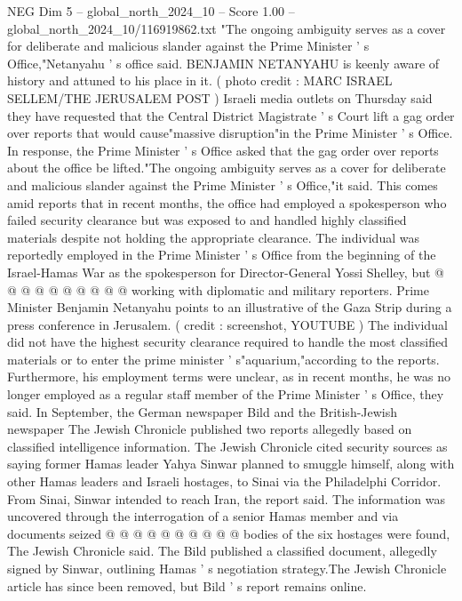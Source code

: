 \begin{textsample}{NEG Dim 5 – global\_north\_2024\_10 – Score 1.00 – global\_north\_2024\_10/116919862.txt}  \label{ex:f5_neg_041}
"The ongoing ambiguity serves as a cover for deliberate and malicious slander against the Prime Minister ' s Office,"Netanyahu ' s office said.
BENJAMIN NETANYAHU is keenly aware of history and attuned to his place in it. ( photo credit : MARC ISRAEL SELLEM/THE JERUSALEM POST ) Israeli media outlets on Thursday said they have requested that the Central District Magistrate ' s Court lift a gag order over reports that would cause"massive disruption"in the Prime Minister ' s Office.
In response, the Prime Minister ' s Office asked that the gag order over reports about the office be lifted."The ongoing ambiguity serves as a cover for deliberate and malicious slander against the Prime Minister ' s Office,"it said.
This comes amid reports that in recent months, the office had employed a spokesperson who failed security clearance but was exposed to and handled highly classified materials despite not holding the appropriate clearance.
The individual was reportedly employed in the Prime Minister ' s Office from the beginning of the Israel-Hamas War as the spokesperson for Director-General Yossi Shelley, but @ @ @ @ @ @ @ @ @ @ working with diplomatic and military reporters.
Prime Minister Benjamin Netanyahu points to an illustrative of the Gaza Strip during a press conference in Jerusalem. ( credit : screenshot, YOUTUBE ) The individual did not have the highest security clearance required to handle the most classified materials or to enter the prime minister ' s"aquarium,"according to the reports.
Furthermore, his employment terms were unclear, as in recent months, he was no longer employed as a regular staff member of the Prime Minister ' s Office, they said.
In September, the German newspaper Bild and the British-Jewish newspaper The Jewish Chronicle published two reports allegedly based on classified intelligence information.
The Jewish Chronicle cited security sources as saying former Hamas leader Yahya Sinwar planned to smuggle himself, along with other Hamas leaders and Israeli hostages, to Sinai via the Philadelphi Corridor.
From Sinai, Sinwar intended to reach Iran, the report said.
The information was uncovered through the interrogation of a senior Hamas member and via documents seized @ @ @ @ @ @ @ @ @ @ bodies of the six hostages were found, The Jewish Chronicle said.
The Bild published a classified document, allegedly signed by Sinwar, outlining Hamas ' s negotiation strategy.The Jewish Chronicle article has since been removed, but Bild ' s report remains online.

\end{textsample}
